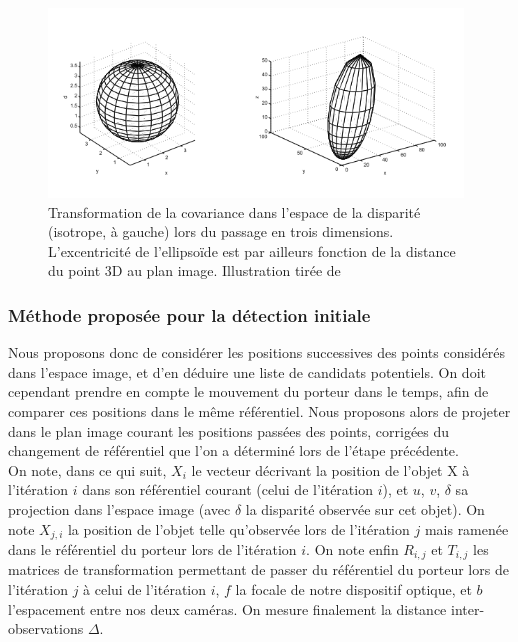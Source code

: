 \begin{figure}[h]
	\centering
	\includegraphics[width = 0.98\textwidth]{Chapter5/graphics/covariance_disp_space_Ivekovic.png}
	\caption{Transformation de la covariance dans l'espace de la disparité (isotrope, à gauche) lors du passage en trois dimensions. L'excentricité de l’ellipsoïde est par ailleurs fonction de la distance du point 3D au plan image. Illustration tirée de \cite{Ivekovic2009}}
	\label{fig:ch5_déformation_disparité_3D}
\end{figure}

\subsubsection{Méthode proposée pour la détection initiale}
Nous proposons donc de considérer les positions successives des points considérés dans l'espace image, et d'en déduire une liste de candidats potentiels. On doit cependant prendre en compte le mouvement du porteur dans le temps, afin de comparer ces positions dans le même référentiel. Nous proposons alors de projeter dans le plan image courant les positions passées des points, corrigées du changement de référentiel que l'on a déterminé lors de l'étape précédente.\\

On note, dans ce qui suit, $X_i$ le vecteur décrivant la position de l'objet X à l'itération $i$ dans son référentiel courant (celui de l'itération $i$), et $u$, $v$, $\delta$ sa projection dans l'espace image (avec $\delta$ la disparité observée sur cet objet). On note $X_{j,i}$ la position de l'objet telle qu'observée lors de l'itération $j$ mais ramenée dans le référentiel du porteur lors de l'itération $i$. On note enfin $R_{i,j}$ et $T_{i,j}$ les matrices de transformation permettant de passer du référentiel du porteur lors de l'itération $j$ à celui de l'itération $i$, $f$ la focale de notre dispositif optique, et $b$ l'espacement entre nos deux caméras. On mesure finalement la distance inter-observations $\Delta$.

